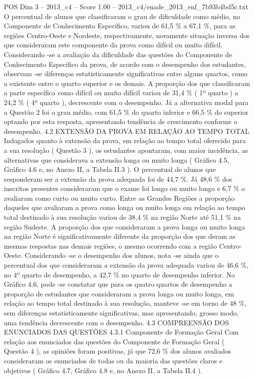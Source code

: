 \begin{textsample}{POS Dim 3 – 2013\_c4 – Score 1.00 – 2013\_c4/enade\_2013\_enf\_7b93b4bd5c.txt}
O percentual de alunos que classificaram o grau de dificuldade como médio, no Componente de Conhecimento Específico, variou de 61,5 \% a 67,1 \%, para as regiões Centro-Oeste e Nordeste, respectivamente, novamente situação inversa dos que consideraram este componente da prova como difícil ou muito difícil.
Considerando -se a avaliação da dificuldade das questões do Componente de Conhecimento Específico da prova, de acordo com o desempenho dos estudantes, observam -se diferenças estatisticamente significativas entre alguns quartos, como a existente entre o quarto superior e os demais.
A proporção dos que classificaram a parte específica como difícil ou muito difícil variou de 31,4 \% ( 1º quarto ) a 24,2 \% ( 4º quarto ), decrescente com o desempenho.
Já a alternativa modal para a Questão 2 foi o grau médio, com 61,5 \% do quarto inferior e 66,5 \% do superior optando por esta resposta, apresentando tendência de crescimento conforme o desempenho. 4.2 EXTENSÃO DA PROVA EM RELAÇÃO AO TEMPO TOTAL Indagados quanto à extensão da prova, em relação ao tempo total oferecido para a sua resolução ( Questão 3 ), os estudantes apontaram, com maior incidência, as alternativas que considerava a extensão longa ou muito longa ( Gráfico 4.5, Gráfico 4.6 e, no Anexo II, a Tabela II.3 ).
O percentual de alunos que responderam ser a extensão da prova adequada foi de 44,7 \%.
Já 48,6 \% dos inscritos presentes consideraram que o exame foi longo ou muito longo e 6,7 \% o avaliaram como curto ou muito curto.
Entre as Grandes Regiões a proporção daqueles que avaliaram a prova como longa ou muito longa em relação ao tempo total destinado à sua resolução variou de 38,4 \% na região Norte até 51,1 \% na região Sudeste.
A proporção dos que consideraram a prova longa ou muito longa na região Norte é significativamente diferente da proporção dos que deram as mesmas respostas nas demais regiões, o mesmo ocorrendo com a região Centro-Oeste.
Considerando -se o desempenho dos alunos, nota -se ainda que o percentual dos que consideraram a extensão da prova adequada variou de 46,6 \%, no 4º quarto de desempenho, a 42,7 \% no quarto de desempenho inferior.
No Gráfico 4.6, pode -se constatar que para os quatro quartos de desempenho a proporção de estudantes que consideraram a prova longa ou muito longa, em relação ao tempo total destinado à sua resolução, manteve -se em torno de 48 \%, sem diferenças estatisticamente significativas, mas apresentando, grosso modo, uma tendência decrescente com o desempenho. 4.3 COMPREENSÃO DOS ENUNCIADOS DAS QUESTÕES 4.3.1 Componente de Formação Geral Com relação aos enunciados das questões do Componente de Formação Geral ( Questão 4 ), as opiniões foram positivas, já que 72,6 \% dos alunos avaliados consideraram os enunciados de todas ou da maioria das questões claros e objetivos ( Gráfico 4.7, Gráfico 4.8 e, no Anexo II, a Tabela II.4 ).

\end{textsample}
